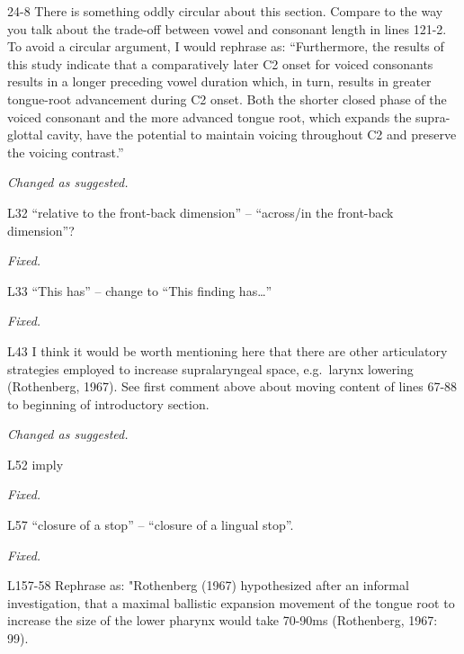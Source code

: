 \documentclass[]{article}
\begin{document}
24-8 There is something oddly circular about this section. Compare to
the way you talk about the trade-off between vowel and consonant length
in lines 121-2. To avoid a circular argument, I would rephrase as:
``Furthermore, the results of this study indicate that a comparatively
later C2 onset for voiced consonants results in a longer preceding vowel
duration which, in turn, results in greater tongue-root advancement
during C2 onset. Both the shorter closed phase of the voiced consonant
and the more advanced tongue root, which expands the supra-glottal
cavity, have the potential to maintain voicing throughout C2 and
preserve the voicing contrast.''

\begin{adjustwidth}{1cm}{} \textit{
Changed as suggested.
} \end{adjustwidth}

L32 ``relative to the front-back dimension'' -- ``across/in the
front-back dimension''?

\begin{adjustwidth}{1cm}{} \textit{
Fixed.
} \end{adjustwidth}

L33 ``This has'' -- change to ``This finding has\ldots{}''

\begin{adjustwidth}{1cm}{} \textit{
Fixed.
} \end{adjustwidth}

L43 I think it would be worth mentioning here that there are other
articulatory strategies employed to increase supralaryngeal space,
e.g.~larynx lowering (Rothenberg, 1967). See first comment above about
moving content of lines 67-88 to beginning of introductory section.

\begin{adjustwidth}{1cm}{} \textit{
Changed as suggested.
} \end{adjustwidth}

L52 imply

\begin{adjustwidth}{1cm}{} \textit{
Fixed.
} \end{adjustwidth}

L57 ``closure of a stop'' -- ``closure of a lingual stop''.

\begin{adjustwidth}{1cm}{} \textit{
Fixed.
} \end{adjustwidth}

L157-58 Rephrase as: "Rothenberg (1967) hypothesized after an informal
investigation, that a maximal ballistic expansion movement of the tongue
root to increase the size of the lower pharynx would take 70-90ms
(Rothenberg, 1967: 99).
\end{document}

